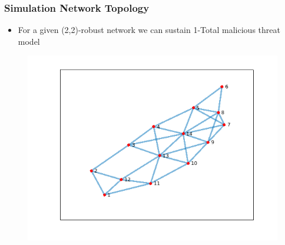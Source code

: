 \documentclass{beamer}
\begin{document}
\begin{frame}
\frametitle{Simulation Network Topology}
\begin{itemize}
\item For a given (2,2)-robust network we can sustain 1-Total malicious threat model 
\end{itemize}
\begin{figure}[!h]
	\includegraphics[scale=0.50]{figures/simulationGraph.png}
	\centering
\end{figure}
\end{frame}

\end{document}
